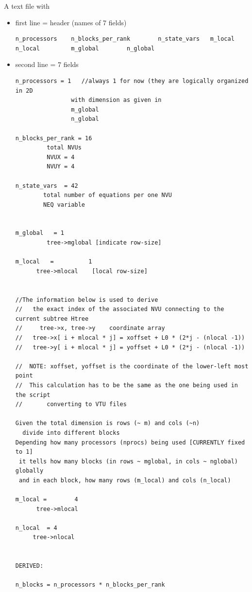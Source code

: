 A text file with 
\begin{itemize}
  \item first line = header (names of 7 fields)

\begin{verbatim}
n_processors    n_blocks_per_rank        n_state_vars   m_local         n_local         m_global        n_global  
\end{verbatim}  
  \item second line = 7 fields

\begin{verbatim}
n_processors = 1   //always 1 for now (they are logically organized in 2D
                with dimension as given in 
                m_global 
                n_global 

n_blocks_per_rank = 16
         total NVUs
         NVUX = 4
         NVUY = 4

n_state_vars  = 42 
        total number of equations per one NVU
        NEQ variable


m_global   = 1
         tree->mglobal [indicate row-size]

m_local   =          1
      tree->mlocal    [local row-size]  


//The information below is used to derive
//   the exact index of the associated NVU connecting to the current subtree Htree
//     tree->x, tree->y    coordinate array
//   tree->x[ i + mlocal * j] = xoffset + L0 * (2*j - (nlocal -1))
//   tree->y[ i + mlocal * j] = yoffset + L0 * (2*j - (nlocal -1))
 
//  NOTE: xoffset, yoffset is the coordinate of the lower-left most point
//  This calculation has to be the same as the one being used in the script
//       converting to VTU files

Given the total dimension is rows (~ m) and cols (~n)
  divide into different blocks
Depending how many processors (nprocs) being used [CURRENTLY fixed to 1]
 it tells how many blocks (in rows ~ mglobal, in cols ~ nglobal) globally
 and in each block, how many rows (m_local) and cols (n_local)

m_local =        4               
      tree->mlocal

n_local  = 4      
     tree->nlocal         


DERIVED:

n_blocks = n_processors * n_blocks_per_rank

\end{verbatim}
  
 
\end{itemize}

